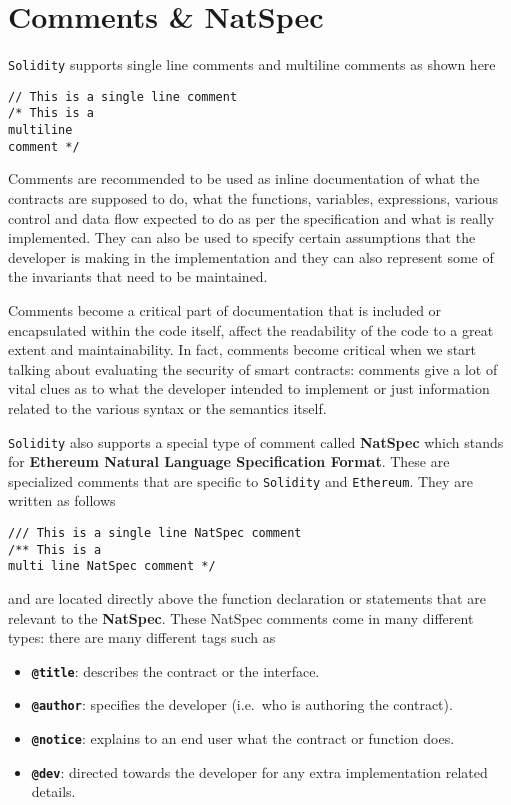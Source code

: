 \section{Comments \& NatSpec}\label{comments-natspec}

\texttt{Solidity} supports single line comments and multiline comments
as shown here

\begin{lstlisting}[language=Solidity,numbers=none]
// This is a single line comment
/* This is a 
multiline
comment */
\end{lstlisting}

Comments are recommended to be used as inline documentation of what the
contracts are supposed to do, what the functions, variables,
expressions, various control and data flow expected to do as per the
specification and what is really implemented. They can also be used to
specify certain assumptions that the developer is making in the
implementation and they can also represent some of the invariants that
need to be maintained.

Comments become a critical part of documentation that is included or
encapsulated within the code itself, affect the readability of the code
to a great extent and maintainability. In fact, comments become critical
when we start talking about evaluating the security of smart contracts:
comments give a lot of vital clues as to what the developer intended to
implement or just information related to the various syntax or the
semantics itself.

\texttt{Solidity} also supports a special type of comment called
\textbf{NatSpec} which stands for \textbf{Ethereum Natural Language
Specification Format}. These are specialized comments that are specific
to \texttt{Solidity} and \texttt{Ethereum}. They are written as follows

\begin{lstlisting}[language=Solidity,numbers=none]
/// This is a single line NatSpec comment
/** This is a 
multi line NatSpec comment */
\end{lstlisting}

and are located directly above the function declaration or statements
that are relevant to the \textbf{NatSpec}. These NatSpec comments come
in many different types: there are many different tags such as

\begin{itemize}
\tightlist
\item
  \textbf{\texttt{@title}}: describes the contract or the interface.
\item
  \textbf{\texttt{@author}}: specifies the developer (i.e.~who is
  authoring the contract).
\item
  \textbf{\texttt{@notice}}: explains to an end user what the contract
  or function does.
\item
  \textbf{\texttt{@dev}}: directed towards the developer for any extra
  implementation related details.
\end{itemize}

